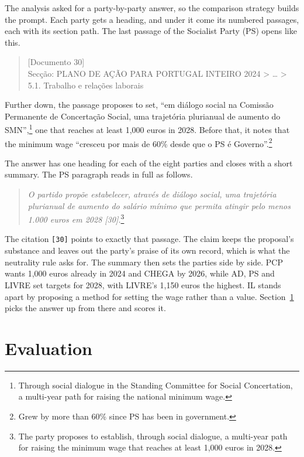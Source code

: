 The analysis asked for a party-by-party answer, so the comparison strategy
builds the prompt. Each party gets a heading, and under it come its numbered
passages, each with its section path. The last passage of the Socialist Party
(PS) opens like this.
\begin{quote}
    \small\ttfamily\raggedright
    [Documento 30]\\
    Secção: PLANO DE AÇÃO PARA PORTUGAL INTEIRO 2024 \textgreater{} \ldots{}
    \textgreater{} 5.1. Trabalho e relações laborais
\end{quote}
Further down, the passage proposes to set, ``em diálogo social na Comissão
Permanente de Concertação Social, uma trajetória plurianual de aumento do
SMN'',\footnote{Through social dialogue in the Standing Committee for Social
Concertation, a multi-year path for raising the national minimum wage.} one
that reaches at least 1,000 euros in 2028. Before that, it notes that the
minimum wage ``cresceu por mais de 60\% desde que o PS é
Governo''.\footnote{Grew by more than 60\% since PS has been in
government.}

The answer has one heading for each of the eight parties and closes with a
short summary. The PS paragraph reads in full as follows.
\begin{quote}
    \small
    \textit{O partido propõe estabelecer, através de diálogo social, uma
    trajetória plurianual de aumento do salário mínimo que permita atingir
    pelo menos 1.000 euros em 2028 [30].}\footnote{The party proposes to
    establish, through social dialogue, a multi-year path for raising the
    minimum wage that reaches at least 1,000 euros in 2028.}
\end{quote}
The citation \texttt{[30]} points to exactly that passage. The claim keeps the
proposal's substance and leaves out the party's praise of its own record,
which is what the neutrality rule asks for. The summary then sets the parties
side by side. PCP wants 1,000 euros already in 2024 and CHEGA by 2026, while
AD, PS and LIVRE set targets for 2028, with LIVRE's 1,150 euros the highest.
IL stands apart by proposing a method for setting the wage rather than a
value. Section~\ref{sec:evaluation} picks the answer up from there and scores
it.

\section{Evaluation} \label{sec:evaluation}

